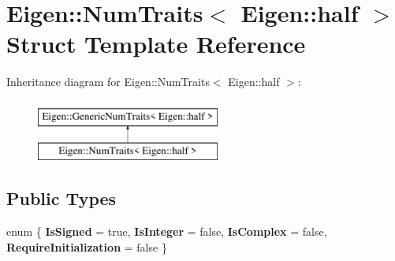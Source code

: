 \hypertarget{struct_eigen_1_1_num_traits_3_01_eigen_1_1half_01_4}{}\section{Eigen\+::Num\+Traits$<$ Eigen\+::half $>$ Struct Template Reference}
\label{struct_eigen_1_1_num_traits_3_01_eigen_1_1half_01_4}
Inheritance diagram for Eigen\+::Num\+Traits$<$ Eigen\+::half $>$\+:\begin{figure}[H]
\begin{center}
\leavevmode
\includegraphics[height=2.000000cm]{struct_eigen_1_1_num_traits_3_01_eigen_1_1half_01_4}
\end{center}
\end{figure}
\subsection*{Public Types}
\begin{DoxyCompactItemize}
\item 
\mbox{\label{struct_eigen_1_1_num_traits_3_01_eigen_1_1half_01_4_adf0686877644bd7dbcc3df3c9f91c3a9}} 
enum \{ {\bfseries Is\+Signed} = true, 
{\bfseries Is\+Integer} = false, 
{\bfseries Is\+Complex} = false, 
{\bfseries Require\+Initialization} = false
 \}
\end{DoxyCompactItemize}
